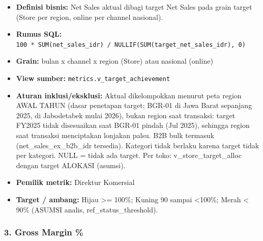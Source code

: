 \documentclass[10pt,a4paper]{article}
\providecommand{\tightlist}{\setlength{\itemsep}{1pt}\setlength{\parskip}{0pt}}
\begin{document}
\begin{itemize}
\tightlist
\item
  \textbf{Definisi bisnis:} Net Sales aktual dibagi target Net Sales pada grain target (Store per region, online per channel nasional).
\item
  \textbf{Rumus SQL:} \texttt{100\ *\ SUM(net\_\allowbreak{}sales\_\allowbreak{}idr)\ /\ NULLIF(SUM(target\_\allowbreak{}net\_\allowbreak{}sales\_\allowbreak{}idr),\ 0)}
\item
  \textbf{Grain:} bulan x channel x region (Store) atau nasional (online)
\item
  \textbf{View sumber:} \texttt{metrics.v\_\allowbreak{}target\_\allowbreak{}achievement}
\item
  \textbf{Aturan inklusi/eksklusi:} Aktual dikelompokkan menurut peta region AWAL TAHUN (dasar penetapan target; BGR-01 di Jawa Barat sepanjang 2025, di Jabodetabek mulai 2026), bukan region saat transaksi: target FY2025 tidak disesuaikan saat BGR-01 pindah (Jul 2025), sehingga region saat transaksi menciptakan lonjakan palsu. B2B bulk termasuk (net\_\allowbreak{}sales\_\allowbreak{}ex\_\allowbreak{}b2b\_\allowbreak{}idr tersedia). Kategori tidak berlaku karena target tidak per kategori. NULL = tidak ada target. Per toko: v\_\allowbreak{}store\_\allowbreak{}target\_\allowbreak{}alloc dengan target ALOKASI (asumsi).
\item
  \textbf{Pemilik metrik:} Direktur Komersial
\item
  \textbf{Target / ambang:} Hijau \textgreater= 100\%; Kuning 90 sampai \textless100\%; Merah \textless{} 90\% (ASUMSI analis, ref\_\allowbreak{}status\_\allowbreak{}threshold).
\end{itemize}

\subsubsection{3. Gross Margin \%}\label{gross-margin}
\end{document}
